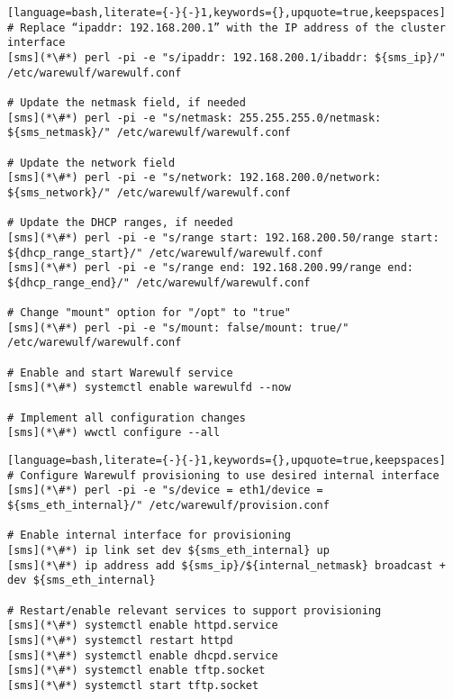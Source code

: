 
\begin{lstlisting}[language=bash,literate={-}{-}1,keywords={},upquote=true,keepspaces]
# Replace “ipaddr: 192.168.200.1” with the IP address of the cluster interface
[sms](*\#*) perl -pi -e "s/ipaddr: 192.168.200.1/ibaddr: ${sms_ip}/" /etc/warewulf/warewulf.conf

# Update the netmask field, if needed
[sms](*\#*) perl -pi -e "s/netmask: 255.255.255.0/netmask: ${sms_netmask}/" /etc/warewulf/warewulf.conf

# Update the network field
[sms](*\#*) perl -pi -e "s/network: 192.168.200.0/network: ${sms_network}/" /etc/warewulf/warewulf.conf

# Update the DHCP ranges, if needed
[sms](*\#*) perl -pi -e "s/range start: 192.168.200.50/range start: ${dhcp_range_start}/" /etc/warewulf/warewulf.conf
[sms](*\#*) perl -pi -e "s/range end: 192.168.200.99/range end: ${dhcp_range_end}/" /etc/warewulf/warewulf.conf

# Change "mount" option for "/opt" to "true"
[sms](*\#*) perl -pi -e "s/mount: false/mount: true/" /etc/warewulf/warewulf.conf

# Enable and start Warewulf service
[sms](*\#*) systemctl enable warewulfd --now

# Implement all configuration changes
[sms](*\#*) wwctl configure --all
\end{lstlisting}
\else
\begin{lstlisting}[language=bash,literate={-}{-}1,keywords={},upquote=true,keepspaces]
# Configure Warewulf provisioning to use desired internal interface
[sms](*\#*) perl -pi -e "s/device = eth1/device = ${sms_eth_internal}/" /etc/warewulf/provision.conf

# Enable internal interface for provisioning
[sms](*\#*) ip link set dev ${sms_eth_internal} up
[sms](*\#*) ip address add ${sms_ip}/${internal_netmask} broadcast + dev ${sms_eth_internal}

# Restart/enable relevant services to support provisioning
[sms](*\#*) systemctl enable httpd.service
[sms](*\#*) systemctl restart httpd
[sms](*\#*) systemctl enable dhcpd.service
[sms](*\#*) systemctl enable tftp.socket
[sms](*\#*) systemctl start tftp.socket
\end{lstlisting}
\fi
